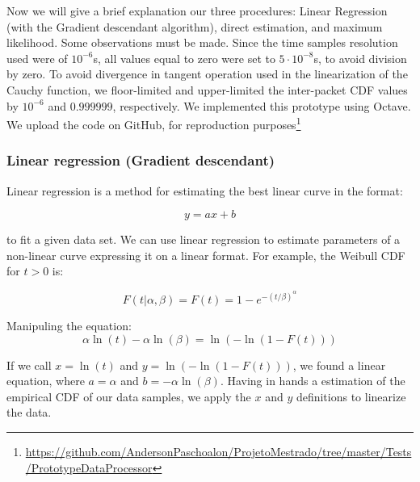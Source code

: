 Now we will give a brief explanation our three procedures: Linear Regression (with the  Gradient descendant algorithm), direct estimation, and maximum likelihood. Some observations must be made. Since the time samples resolution used were of $10^{-6}$s, all values equal to zero were set to  $5\cdot10^{-8}$s, to avoid division by zero. To avoid divergence in tangent operation used in the linearization of the Cauchy function, we floor-limited and upper-limited the inter-packet CDF  values by  $10^{-6}$ and $0.999999$, respectively. We implemented this prototype using Octave. We upload the code on GitHub, for reproduction purposes\footnote{\href{https://github.com/AndersonPaschoalon/ProjetoMestrado/tree/master/Tests/PrototypeDataProcessor}{https://github.com/AndersonPaschoalon/ProjetoMestrado/tree/master/Tests/PrototypeDataProcessor}}





\subsubsection{Linear regression (Gradient descendant)}

Linear regression is a method for estimating the best linear curve in the format:

\begin{equation}
y = ax + b
\end{equation}

to fit a given data set. We can use linear regression to estimate parameters of a non-linear curve expressing it on a linear format. For example, the Weibull CDF for $t > 0$ is:

\begin{equation}
F(t|\alpha, \beta) = F(t) = 1 - e^{-(t/\beta)^{\alpha}}
\end{equation}

Manipuling the equation:
\begin{equation}
\alpha\ln{(t)} - \alpha\ln{(\beta)} = \ln{(-\ln{(1 - F(t))})}
\end{equation}

If we call $x = \ln{(t)}$ and $y = \ln{(-\ln{(1 - F(t))})}$, we found a linear equation, where $a = \alpha$ and $b = -\alpha\ln{(\beta)}$. Having in hands a estimation of the empirical CDF of our data samples, we apply the $x$ and $y$ definitions to linearize the data. 

